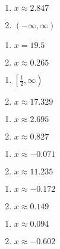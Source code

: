 \begin{multicols}{2}
\begin{enumerate}
	\item $x \approx 2.847$
	\item $(-\infty, \infty)$
\end{enumerate} \setcounter{Review}{\value{enumi}}
\end{multicols}
\begin{multicols}{2}
\begin{enumerate}	\setcounter{enumi}{\value{Review}}
	\item $x = 19.5$
	\item $x \approx 0.265$
\end{enumerate} \setcounter{Review}{\value{enumi}}
\end{multicols}
\begin{multicols}{2}
\begin{enumerate}	\setcounter{enumi}{\value{Review}}
	\item $\left[\frac{1}{2}, \infty\right)$
	\item $x \approx 17.329$
\end{enumerate} \setcounter{Review}{\value{enumi}}
\end{multicols}
\begin{multicols}{2}
\begin{enumerate}	\setcounter{enumi}{\value{Review}}
	\item $x \approx 2.695$
    \item $x \approx 0.827$
\end{enumerate} \setcounter{Review}{\value{enumi}}
\end{multicols}
\begin{multicols}{2}
\begin{enumerate}	\setcounter{enumi}{\value{Review}}
    \item $x \approx -0.071$
    \item $x \approx 11.235$
\end{enumerate} \setcounter{Review}{\value{enumi}}
\end{multicols}
\begin{multicols}{2}
\begin{enumerate}	\setcounter{enumi}{\value{Review}}
    \item $x \approx -0.172$
    \item $x \approx 0.149$
\end{enumerate} \setcounter{Review}{\value{enumi}}
\end{multicols}
\begin{multicols}{2}
\begin{enumerate}	\setcounter{enumi}{\value{Review}}
    \item $x \approx 0.094$
    \item $x \approx -0.602$
\end{enumerate} \setcounter{Review}{\value{enumi}}
\end{multicols}
